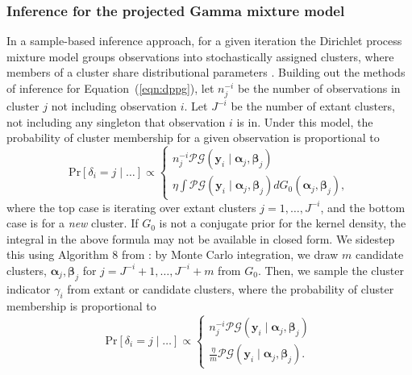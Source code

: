 \subsubsection{Inference for the projected Gamma mixture model}
In a sample-based inference approach, for a given iteration the Dirichlet process mixture model 
    groups observations into stochastically assigned clusters, where members of a cluster share 
    distributional parameters \citep{ascolani2022}. Building out the methods of inference for Equation~(\ref{eqn:dppg}), 
    let $n_j^{-i}$ be the number of observations in cluster $j$ not including observation $i$.  Let $J^{-i}$ be 
    the number of extant clusters, not including any singleton that observation $i$ is in. Under this model, 
    the probability of cluster membership for a given observation is proportional to
\begin{equation*}
    \text{Pr}\left[\delta_i = j\mid\ldots\right] \propto \begin{cases}
        n_j^{-i}\mathcal{PG}\left(\bm{y}_i\mid\bm{\alpha}_j,\bm{\beta}_j\right)\\ %
        \eta\int\mathcal{PG}\left(\bm{y}_i\mid\bm{\alpha}_j,\bm{\beta}_j\right)dG_0(\bm{\alpha}_j,\bm{\beta}_j),%
        \end{cases}
\end{equation*}
where the top case is iterating over extant clusters $j = 1,\ldots, J^{-i}$, and the bottom case is
    for a \emph{new} cluster. If $G_0$ is not a conjugate prior for the kernel density, the integral in the 
    above formula may not be available in closed form. We sidestep this using Algorithm 8 from \cite{neal2000}: 
    by Monte Carlo integration, we draw $m$ candidate clusters, $\bm{\alpha}_j,\bm{\beta}_j$ for
    $j = J^{-i} + 1,\ldots, J^{-i} + m$ from $G_0$. Then, we sample the cluster indicator 
    $\gamma_i$ from extant or candidate clusters, where the probability of cluster membership is proportional to
\begin{equation}
    \text{Pr}\left[\delta_i = j\mid\ldots\right] \propto \begin{cases}
        n_j^{-i}\mathcal{PG}\left(\bm{y}_i\mid\bm{\alpha}_j,\bm{\beta}_j\right)\\ %
        \frac{\eta}{m}\mathcal{PG}\left(\bm{y}_i\mid\bm{\alpha}_j,\bm{\beta}_j\right). %
        \end{cases}
\end{equation}

